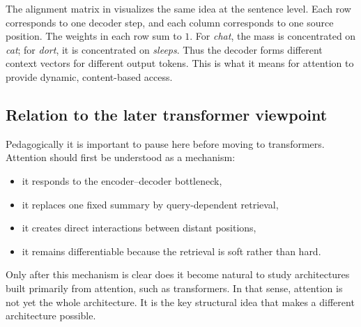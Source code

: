 The alignment matrix in  visualizes the same idea at the sentence level.
Each row corresponds to one decoder step, and each column corresponds to one source position.
The weights in each row sum to $1$.
For \emph{chat}, the mass is concentrated on \emph{cat}; for \emph{dort}, it is concentrated on \emph{sleeps}.
Thus the decoder forms different context vectors for different output tokens.
This is what it means for attention to provide dynamic, content-based access.

\subsection*{Relation to the later transformer viewpoint}

Pedagogically it is important to pause here before moving to transformers.
Attention should first be understood as a mechanism:
\begin{itemize}
    \item it responds to the encoder--decoder bottleneck,
    \item it replaces one fixed summary by query-dependent retrieval,
    \item it creates direct interactions between distant positions,
    \item it remains differentiable because the retrieval is soft rather than hard.
\end{itemize}
Only after this mechanism is clear does it become natural to study architectures built primarily from attention, such as transformers.
In that sense, attention is not yet the whole architecture.
It is the key structural idea that makes a different architecture possible.




